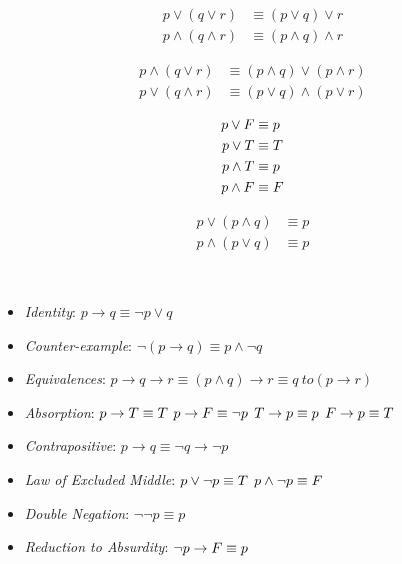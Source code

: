 \begin{definition}
\begin{align}
    p \lor (q \lor r) &\equiv (p \lor q) \lor r \\
    p \land (q \land r) &\equiv (p \land q) \land r
\end{align}
\end{definition}

\begin{definition}
\begin{align}
    p \land (q \lor r) &\equiv (p \land q) \lor (p \land r) \\
    p \lor (q \land r) &\equiv (p \lor q) \land (p \lor r)
\end{align}
\end{definition}

\begin{definition}
\begin{align}
    p \lor \relax{F} &\equiv p \\
    p \lor \relax{T} &\equiv \relax{T} \\
    p \land \relax{T} &\equiv p \\
    p \land \relax{F} &\equiv \relax{F}
\end{align}
\end{definition}

\begin{definition}
\begin{align}
    p \lor (p \land q) &\equiv p \\
    p \land (p \lor q) &\equiv p
\end{align}
\end{definition}

\begin{definition}\ \\
\begin{itemize}
    \item \textit{Identity}: $p \to q \equiv \neg p \lor q$
    \item \textit{Counter-example}: $\neg(p \to q) \equiv p \land \neg q$
    \item \textit{Equivalences}: $p \to q \to r \equiv (p \land q) \to r \equiv q\ to (p \to r)$
    \item \textit{Absorption}:
        \subitem $p \to \relax{T} \equiv T$
        \subitem $p \to \relax{F} \equiv \neg p$
        \subitem $\relax{T} \to p \equiv p$
        \subitem $\relax{F} \to p \equiv T$
    \item \textit{Contrapositive}: $p \to q \equiv \neg q \to \neg p$
    \item \textit{Law of Excluded Middle}: 
        \subitem $p \lor \neg p \equiv \relax{T}$
        \subitem $p \land \neg p \equiv \relax{F}$
    \item \textit{Double Negation}: $\neg \neg p \equiv p$
    \item \textit{Reduction to Absurdity}: $\neg p \to \relax{F} \equiv p$
\end{itemize}
\end{definition}

